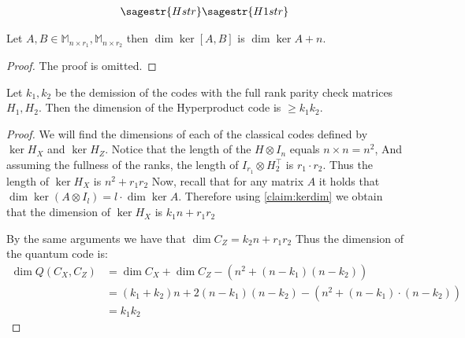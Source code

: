 \begin{equation*}
  \begin{split}
    \sagestr{Hstr} \sagestr{H1str} 
  \end{split}
\end{equation*}


\begin{claim}
  \label{claim:kerdim}
  Let  $A,B \in \mathbb{M}_{n\times r_{1}}, \mathbb{M}_{n\times r_{2}}$ then  $\dim \ker [A ,B]$ is $ \dim \ker A + n $. 
\end{claim}

\begin{proof}
  The proof is omitted. 
\end{proof}

\begin{claim}
  Let $k_{1},k_{2}$ be the demission of the codes with the full rank  parity check matrices $H_{1},H_{2}$. Then the dimension of the Hyperproduct code is $ \ge k_{1}k_{2}$. 
\end{claim}

\begin{proof}

  We will find the dimensions of each of the classical codes defined by $\ker H_{X}$ and $ \ker H_{Z}$. Notice that the length of the $H \otimes I_{n}$ equals $n\times n = n^2$, And  assuming the fullness of the ranks, the length of $ I_{r_{1}} \otimes  H_{2}^{\top} $  is $ r_{1}\cdot r_{2}$. Thus the length of $ \ker H_{X}$ is  $n^{2} + r_{1}r_{2}$ 
  Now, recall that for any matrix $A$ it holds that $\dim \ker \left( A \otimes I_{l} \right) = l \cdot \dim \ker A$. Therefore using \cref{claim:kerdim} we obtain that the dimension of $\ker H_{X}$ is $k_{1}n + r_{1}r_{2}$ 

  By the same arguments we have that $\dim C_{Z} = k_{2}n + r_{1}r_{2}$ %
Thus the dimension of the quantum code is:
  \begin{equation*}
    \begin{split}
      \dim Q\left( C_{X}, C_{Z} \right) &= \dim C_{X} + \dim C_{Z} - \left(  n^{2} + (n-k_{1})(n-k_{2})  \right) \\ 
      & = \left( k_{1} + k_{2} \right)n + 2(n-k_{1})(n-k_{2}) -\left(  n^{2} +  (n-k_{1}) \cdot \left( n -k_{2}\right) \right) \\
      & =k_{1}k_{2} 
    \end{split}
  \end{equation*}
\end{proof}

